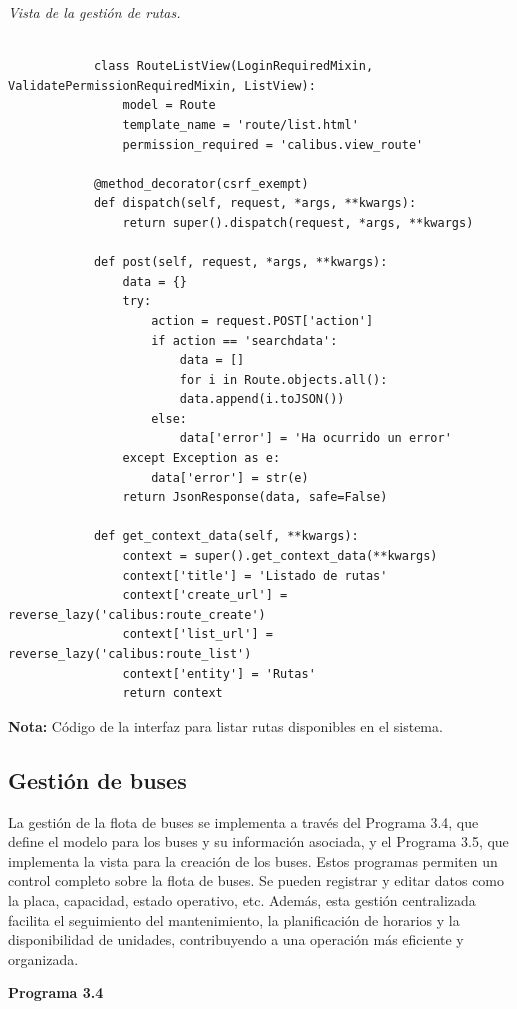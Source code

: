 		\textit{Vista de la gestión de rutas.} %
		\vspace{0.3cm} %
		\begin{lstlisting}[lineskip=-1pt]
			
			class RouteListView(LoginRequiredMixin, ValidatePermissionRequiredMixin, ListView):
				model = Route
				template_name = 'route/list.html'
				permission_required = 'calibus.view_route'
				
			@method_decorator(csrf_exempt)
			def dispatch(self, request, *args, **kwargs):
				return super().dispatch(request, *args, **kwargs)
			
			def post(self, request, *args, **kwargs):
				data = {}
				try:
					action = request.POST['action']
					if action == 'searchdata':
						data = []
						for i in Route.objects.all():
						data.append(i.toJSON())
					else:
						data['error'] = 'Ha ocurrido un error'
				except Exception as e:
					data['error'] = str(e)
				return JsonResponse(data, safe=False)
			
			def get_context_data(self, **kwargs):
				context = super().get_context_data(**kwargs)
				context['title'] = 'Listado de rutas'
				context['create_url'] = reverse_lazy('calibus:route_create')
				context['list_url'] = reverse_lazy('calibus:route_list')
				context['entity'] = 'Rutas'
				return context
		\end{lstlisting}
		
		\textbf{Nota:} Código de la interfaz para listar rutas disponibles en el sistema.
	
	\subsection{Gestión de buses}
	
	La gestión de la flota de buses se implementa a través del Programa 3.4, que define el modelo para los buses y su información asociada, y el Programa 3.5, que implementa la vista para la creación de los buses. Estos programas permiten un control completo sobre la flota de buses. Se pueden registrar y editar datos como la placa, capacidad, estado operativo, etc. Además, esta gestión centralizada facilita el seguimiento del mantenimiento, la planificación de horarios y la disponibilidad de unidades, contribuyendo a una operación más eficiente y organizada.
	
	\textbf{Programa 3.4}
	
